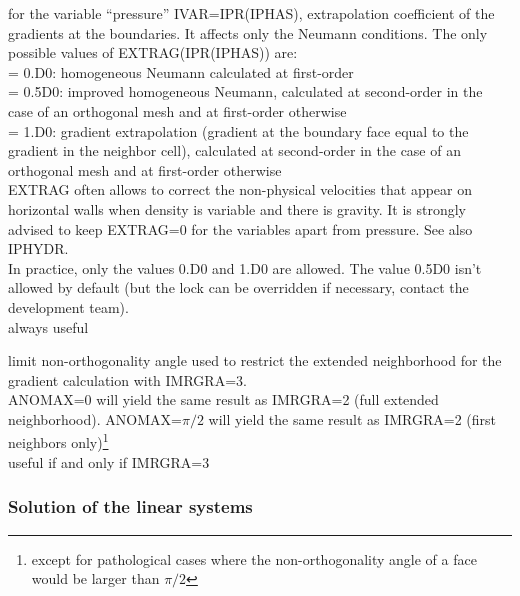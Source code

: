 {for the variable ``pressure'' IVAR=IPR(IPHAS), extrapolation coefficient
of the gradients at the boundaries. It affects only the Neumann conditions.
The only possible values of EXTRAG(IPR(IPHAS)) are:\\
\hspace*{1.3cm}= 0.D0: homogeneous Neumann calculated at first-order\\
\hspace*{1.3cm}= 0.5D0: improved homogeneous Neumann, calculated at
second-order in the case of an orthogonal mesh and at first-order otherwise\\
\hspace*{1.3cm}= 1.D0: gradient extrapolation (gradient at the boundary face
equal to the gradient in the neighbor cell), calculated at
second-order in the case of an orthogonal mesh and at first-order otherwise\\
EXTRAG often allows to correct the non-physical velocities that
appear on horizontal walls when density is variable and there is gravity.
It is strongly advised to keep EXTRAG=0 for the variables apart from
pressure. See also IPHYDR.\\
In practice, only the values 0.D0 and 1.D0 are allowed. The
value 0.5D0 isn't allowed by default (but the lock can be overridden if
necessary, contact the development team).\\
always useful}

{limit non-orthogonality angle used to restrict the extended neighborhood for
the gradient calculation with IMRGRA=3.\\
ANOMAX=0 will yield the same result as IMRGRA=2 (full extended
neighborhood). ANOMAX=$\pi/2$ will yield the same result as IMRGRA=2 (first
neighbors only)\footnote{except for pathological cases where the
non-orthogonality angle of a face would be larger than $\pi/2$}\\
useful if and only if IMRGRA=3}

\subsubsection{Solution of the linear systems}

